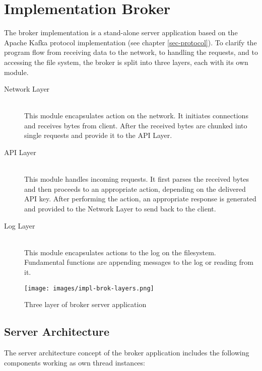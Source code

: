 \chapter{Implementation Broker}
\label{chap:broker}

The broker implementation is a stand-alone server application based on the
Apache Kafka protocol implementation (see chapter \ref{sec-protocol}). To clarify the
program flow from receiving data to the network, to handling the requests, and
to accessing the file system, the broker is split into three layers, each with its
own module.

\begin{description}
    \item [Network Layer] \hfill \\
        This module encapsulates action on the network. It initiates
        connections and receives bytes from client. After the received bytes are
        chunked into single requests and provide it to the API Layer.
    \item [API Layer] \hfill \\
        This module handles incoming requests. It first parses the
        received bytes and then proceeds to an appropriate action,
        depending on the delivered API key. After performing the action, an
        appropriate response is generated and provided to the Network Layer
        to send back to the client. 
    \item [Log Layer] \hfill \\
        This module encapsulates actions to the log on the filesystem.
        Fundamental functions are appending messages to the log or reading from
        it.
\end{description}

\begin{figure}[H]
    \centering
    \texttt{[image: images/impl-brok-layers.png]}
    \caption{Three layer of broker server application}
    \label{fig:impl-brok-layers}
\end{figure}

\section{Server Architecture}
\label{sec:impl-broker-threading}
The server architecture concept of the broker application includes the
following components working as own thread instances: 

